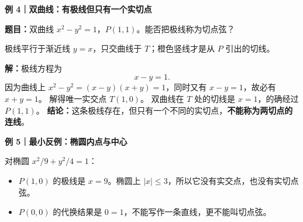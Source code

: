 \begin{examplebox}
\medskip
\par
\begin{minipage}{\linewidth}
\textbf{\textcolor{CExample}{例 4｜双曲线：有极线但只有一个实切点}}\par\smallskip
\textbf{题目：}双曲线 $x^2-y^2=1$，$P(1,1)$。能否把极线称为切点弦？

\begin{center}

\end{center}
极线平行于渐近线 $y=x$，只交曲线于 $T$；橙色竖线才是从 $P$ 引出的切线。

\end{minipage}
\par
\textbf{解：}极线方程为
\[
 \boxed{x-y=1}.
\]
因为曲线上 $x^2-y^2=(x-y)(x+y)=1$，同时又有 $x-y=1$，故必有 $x+y=1$。
解得唯一实交点 $T(1,0)$。
双曲线在 $T$ 处的切线是 $x=1$，的确经过 $P(1,1)$。
\textbf{结论：}这条极线存在，但只有一个不同的实切点，\textbf{不能称为两切点的连线}。

\medskip
\textbf{\textcolor{CExample}{例 5｜最小反例：椭圆内点与中心}}\par\smallskip
对椭圆 $x^2/9+y^2/4=1$：
\begin{itemize}[leftmargin=*,itemsep=0.35em]
 \item $P(1,0)$ 的极线是 $x=9$。椭圆上 $|x|\le3$，所以它没有实交点，也没有实切点弦。
 \item $P(0,0)$ 的代换结果是 $0=1$，不能写作一条直线，更不能叫切点弦。
\end{itemize}
\end{examplebox}
